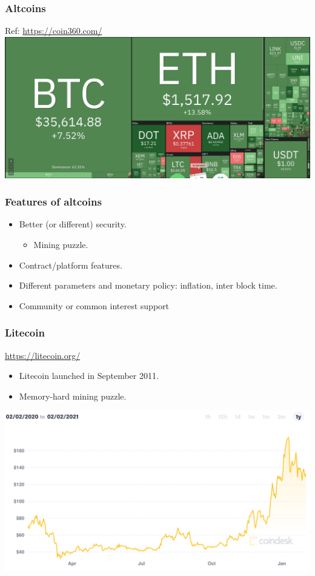 \documentclass{beamer}
\begin{document}
\begin{frame}
  \frametitle{Altcoins}
 	\centering
 	Ref: \url{https://coin360.com/}
	\includegraphics[scale=0.19]{altcoins}
\end{frame}
\begin{frame}
  \frametitle{Features of altcoins}
  
	\begin{itemize}
		\item Better (or different) security.
			\begin{itemize}
				\item Mining puzzle.
			\end{itemize}
			\pause
		\item Contract/platform features. \pause
		\item Different parameters and monetary policy: inflation, inter block time. \pause
		\item Community or common interest support
	\end{itemize}
\end{frame}
\begin{frame}
  \frametitle{Litecoin}
  \url{https://litecoin.org/}
  	\begin{itemize}
  		\item Litecoin launched in September 2011.
		\item Memory-hard mining puzzle.
  	\end{itemize}
  	
 	\centering
	\includegraphics[scale=0.35]{litecoin}
\end{frame}
\end{document}
